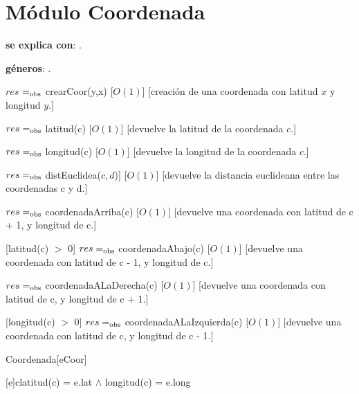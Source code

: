 \section{Módulo Coordenada}

\begin{Interfaz}

	\textbf{se explica con}: .

	\textbf{géneros}: .


	{$res$ $=_{\mathrm{obs}}$ crearCoor(y,x)}
	[$O(1)$]
	[creación de una coordenada con latitud $x$ y longitud $y$.]

	{$res =_{\mathrm{obs}}$ latitud(c)}
	[$O(1)$]
	[devuelve la latitud de la coordenada $c$.]

	{$res =_{\mathrm{obs}}$ longitud(c)}
	[$O(1)$]
	[devuelve la longitud de la coordenada $c$.]

	{$res =_{\mathrm{obs}}$ distEuclidea($c, d$)]}
	[$O(1)$]
	[devuelve la distancia euclideana entre las coordenadas c y d.]

	{$res =_{\mathrm{obs}}$ coordenadaArriba(c)}
	[$O(1)$]
	[devuelve una coordenada con latitud de c + 1, y longitud de c.]

	[latitud(c) $>$ 0]
	{$res =_{\mathrm{obs}}$ coordenadaAbajo(c)}
	[$O(1)$]
	[devuelve una coordenada con latitud de c - 1, y longitud de c.]

	{$res =_{\mathrm{obs}}$ coordenadaALaDerecha(c)}
	[$O(1)$]
	[devuelve una coordenada con latitud de c, y longitud de c + 1.]

	[longitud(c) $>$ 0]
	{$res =_{\mathrm{obs}}$ coordenadaALaIzquierda(c)}
	[$O(1)$]
	[devuelve una coordenada con latitud de c, y longitud de c - 1.]

\end{Interfaz}


\begin{Representacion}


	\begin{Estructura}{Coordenada}[eCoor]
		\begin{Tupla}[eCoor]
		\end{Tupla}
	\end{Estructura}





	{c}{latitud(c) = e.lat $\land$ longitud(c) = e.long}

\end{Representacion}


